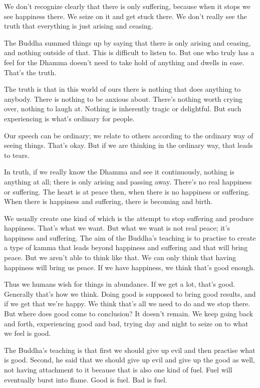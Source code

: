We don't recognize clearly that there is only suffering, because when it stops we see happiness there. We seize on it and get stuck there. We don't really see the truth that everything is just arising and ceasing.

The Buddha summed things up by saying that there is only arising and ceasing, and nothing outside of that. This is difficult to listen to. But one who truly has a feel for the Dhamma doesn't need to take hold of anything and dwells in ease. That's the truth.

The truth is that in this world of ours there is nothing that does anything to anybody. There is nothing to be anxious about. There's nothing worth crying over, nothing to laugh at. Nothing is inherently tragic or delightful. But such experiencing is what's ordinary for people.

Our speech can be ordinary; we relate to others according to the ordinary way of seeing things. That's okay. But if we are thinking in the ordinary way, that leads to tears.

In truth, if we really know the Dhamma and see it continuously, nothing is anything at all; there is only arising and passing away. There's no real happiness or suffering. The heart is at peace then, when there is no happiness or suffering. When there is happiness and suffering, there is becoming and birth.

We usually create one kind of  which is the attempt to stop suffering and produce happiness. That's what we want. But what we want is not real peace; it's happiness and suffering. The aim of the Buddha's teaching is to practise to create a type of kamma that leads beyond happiness and suffering and that will bring peace. But we aren't able to think like that. We can only think that having happiness will bring us peace. If we have happiness, we think that's good enough.

Thus we humans wish for things in abundance. If we get a lot, that's good. Generally that's how we think. Doing good is supposed to bring good results, and if we get that we're happy. We think that's all we need to do and we stop there. But where does good come to conclusion? It doesn't remain. We keep going back and forth, experiencing good and bad, trying day and night to seize on to what we feel is good.

The Buddha's teaching is that first we should give up evil and then practise what is good. Second, he said that we should give up evil and give up the good as well, not having attachment to it because that is also one kind of fuel. Fuel will eventually burst into flame. Good is fuel. Bad is fuel.

